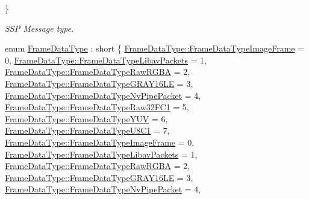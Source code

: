 \begin{DoxyCompactItemize}
 \}\begin{DoxyCompactList}\small\item\em S\+SP Message type. \end{DoxyCompactList}
\item 
enum \hyperlink{namespacemoetsi_1_1ssp_aa9b059f0bc7a91855545ee887f2d56c4}{Frame\+Data\+Type} \+: short \{ \newline
\hyperlink{namespacemoetsi_1_1ssp_aa9b059f0bc7a91855545ee887f2d56c4a6f466822a5d24eab84554c0bf415903d}{Frame\+Data\+Type\+::\+Frame\+Data\+Type\+Image\+Frame} = 0, 
\hyperlink{namespacemoetsi_1_1ssp_aa9b059f0bc7a91855545ee887f2d56c4a234b11a09d69865a40eb4db132fe7096}{Frame\+Data\+Type\+::\+Frame\+Data\+Type\+Libav\+Packets} = 1, 
\hyperlink{namespacemoetsi_1_1ssp_aa9b059f0bc7a91855545ee887f2d56c4ac2cdf85544553bda5453b401b79964eb}{Frame\+Data\+Type\+::\+Frame\+Data\+Type\+Raw\+R\+G\+BA} = 2, 
\hyperlink{namespacemoetsi_1_1ssp_aa9b059f0bc7a91855545ee887f2d56c4a44d909233498ad3dec5a3e3e95e908ca}{Frame\+Data\+Type\+::\+Frame\+Data\+Type\+G\+R\+A\+Y16\+LE} = 3, 
\newline
\hyperlink{namespacemoetsi_1_1ssp_aa9b059f0bc7a91855545ee887f2d56c4a1628ff13722acd71d3e90b51c8faa31c}{Frame\+Data\+Type\+::\+Frame\+Data\+Type\+Nv\+Pipe\+Packet} = 4, 
\hyperlink{namespacemoetsi_1_1ssp_aa9b059f0bc7a91855545ee887f2d56c4abb6735708adc6efcecf59e0e1e6c9387}{Frame\+Data\+Type\+::\+Frame\+Data\+Type\+Raw32\+F\+C1} = 5, 
\hyperlink{namespacemoetsi_1_1ssp_aa9b059f0bc7a91855545ee887f2d56c4a6191c61c70f47aa00e2f9251d8ad59fa}{Frame\+Data\+Type\+::\+Frame\+Data\+Type\+Y\+UV} = 6, 
\hyperlink{namespacemoetsi_1_1ssp_aa9b059f0bc7a91855545ee887f2d56c4acd5fc2d48d13ef44a9806046ae34d56b}{Frame\+Data\+Type\+::\+Frame\+Data\+Type\+U8\+C1} = 7, 
\newline
\hyperlink{namespacemoetsi_1_1ssp_aa9b059f0bc7a91855545ee887f2d56c4a6f466822a5d24eab84554c0bf415903d}{Frame\+Data\+Type\+::\+Frame\+Data\+Type\+Image\+Frame} = 0, 
\hyperlink{namespacemoetsi_1_1ssp_aa9b059f0bc7a91855545ee887f2d56c4a234b11a09d69865a40eb4db132fe7096}{Frame\+Data\+Type\+::\+Frame\+Data\+Type\+Libav\+Packets} = 1, 
\hyperlink{namespacemoetsi_1_1ssp_aa9b059f0bc7a91855545ee887f2d56c4ac2cdf85544553bda5453b401b79964eb}{Frame\+Data\+Type\+::\+Frame\+Data\+Type\+Raw\+R\+G\+BA} = 2, 
\hyperlink{namespacemoetsi_1_1ssp_aa9b059f0bc7a91855545ee887f2d56c4a44d909233498ad3dec5a3e3e95e908ca}{Frame\+Data\+Type\+::\+Frame\+Data\+Type\+G\+R\+A\+Y16\+LE} = 3, 
\newline
\hyperlink{namespacemoetsi_1_1ssp_aa9b059f0bc7a91855545ee887f2d56c4a1628ff13722acd71d3e90b51c8faa31c}{Frame\+Data\+Type\+::\+Frame\+Data\+Type\+Nv\+Pipe\+Packet} = 4, 

\end{DoxyCompactItemize}
